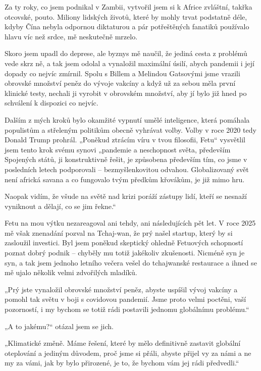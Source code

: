Za ty roky, co jsem podnikal v Zambii, vytvořil jsem si k Africe zvláštní, takřka otcovské, pouto. Miliony lidských životů, které by mohly trvat podstatně déle, kdyby Čína nebyla odpornou diktaturou a pár potřeštěných fanatiků používalo hlavu víc než srdce, mě neskutečně mrzelo.

Skoro jsem upadl do deprese, ale byznys mě naučil, že jediná cesta z problémů vede skrz ně, a tak jsem odolal a vynaložil maximální úsilí, abych pandemii i její dopady co nejvíc zmírnil. Spolu s Billem a Melindou Gatsovými jsme vrazili obrovské množství peněz do vývoje vakcíny a když už za sebou měla první klinické testy, nechali ji vyrobit v obrovském množství, aby jí bylo již hned po schválení k dispozici co nejvíc.
 
Dalším z mých kroků bylo okamžité vypnutí umělé inteligence, která pomáhala populistům a střeleným politikům obecně vyhrávat volby. Volby v roce 2020 tedy Donald Trump prohrál. „Poněkud ztrácím víru v tvou filosofii, Fetu“ vysvětlil jsem tento krok svému synovi „pandemie a neschopnost světa, především Spojených států, ji konstruktivně řešit, je způsobena především tím, co jsme v posledních letech podporovali – bezmyšlenkovitou odvahou. Globalizovaný svět není africká savana a co fungovalo tvým předkům křovákům, je již mimo hru. 

Naopak vidím, že všude na světě nad krizi poráží zástupy lidí, kteří se nesnaží vyniknout a dělají, co se jim řekne.“

Fetu na mou výtku nezareagoval ani tehdy, ani následujících pět let. V roce 2025 mě však znenadání pozval na Tchaj-wan, že prý našel startup, který by si zasloužil investici. Byl jsem poněkud skeptický ohledně Fetuových schopností poznat dobrý podnik – chyběly mu totiž jakékoliv zkušenosti. Nicméně syn je syn, a tak jsem jednoho letního večera vešel do tchajwanské restaurace a ihned se mě ujalo několik velmi zdvořilých mladíků.

„Prý jste vynaložil obrovské množství peněz, abyste uspíšil vývoj vakcíny a pomohl tak světu v boji s covidovou pandemií. Jsme proto velmi poctěni, vaší pozorností, i my bychom se totiž rádi postavili jednomu globálnímu problému.“

„A to jakému?“ otázal jsem se jich.

„Klimatické změně. Máme řešení, které by mělo definitivně zastavit globální oteplování a jediným důvodem, proč jsme si přáli, abyste přijel vy za námi a ne my za vámi, jak by bylo přirozené, je to, že bychom vám jej rádi předvedli.“ 

